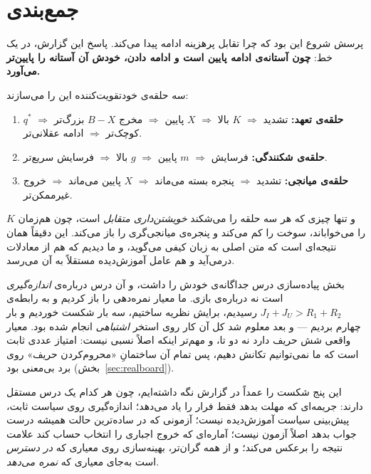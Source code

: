 \documentclass[12pt,a4paper]{article}
\begin{document}
\section{جمع‌بندی}\label{sec:concl}

پرسش شروع این بود که چرا تقابل پرهزینه ادامه پیدا می‌کند. پاسخ این گزارش،
در یک خط: \textbf{چون آستانه‌ی ادامه پایین است و ادامه دادن، خودش آن آستانه
را پایین‌تر می‌آورد.}

سه حلقه‌ی خودتقویت‌کننده این را می‌سازند:
\begin{enumerate}[leftmargin=1.7em,itemsep=3pt]
  \item \textbf{حلقه‌ی تعهد:} تشدید $\Rightarrow$ $K$ بالا $\Rightarrow$
        $X$ پایین $\Rightarrow$ مخرج $B-X$ بزرگ‌تر $\Rightarrow$
        $q^\ast$ کوچک‌تر $\Rightarrow$ ادامه عقلانی‌تر.
  \item \textbf{حلقه‌ی شکنندگی:} فرسایش $\Rightarrow$ $m$ پایین
        $\Rightarrow$ $g$ بالا $\Rightarrow$ فرسایش سریع‌تر.
  \item \textbf{حلقه‌ی میانجی:} تشدید $\Rightarrow$ پنجره بسته می‌ماند
        $\Rightarrow$ $X$ پایین می‌ماند $\Rightarrow$ خروج غیرممکن‌تر.
\end{enumerate}

و تنها چیزی که هر سه حلقه را می‌شکند \emph{خویشتن‌داری متقابل} است، چون
هم‌زمان $K$ را می‌خواباند، سوخت را کم می‌کند و پنجره‌ی میانجی‌گری را باز
می‌کند. این دقیقاً همان نتیجه‌ای است که متن اصلی به زبان کیفی می‌گوید، و ما
دیدیم که هم از معادلات درمی‌آید و هم عامل آموزش‌دیده مستقلاً به آن می‌رسد.

بخش پیاده‌سازی درس جداگانه‌ی خودش را داشت، و آن درس درباره‌ی
\emph{اندازه‌گیری} است نه درباره‌ی بازی. ما معیار نمره‌دهی را باز کردیم و به
رابطه‌ی $J_I+J_U>R_1+R_2$ رسیدیم، برایش نظریه ساختیم، سه بار شکست خوردیم و
بار چهارم بردیم — و بعد معلوم شد کل آن کار روی استخر \emph{اشتباهی} انجام
شده بود. معیار واقعی شش حریف دارد نه دو تا، و مهم‌تر اینکه اصلاً نسبی
نیست: امتیاز  عددی ثابت است که ما نمی‌توانیم تکانش دهیم، پس
تمام آن ساختمانِ «محروم‌کردن حریف» روی برد بی‌معنی بود
(بخش~\ref{sec:realboard}).

این پنج شکست را عمداً در گزارش نگه داشته‌ایم، چون هر کدام یک درس مستقل
دارند: جریمه‌ای که مهلت بدهد فقط فرار را یاد می‌دهد؛ اندازه‌گیری روی سیاست
ثابت، پیش‌بینی سیاست آموزش‌دیده نیست؛ آزمونی که در ساده‌ترین حالت همیشه
درست جواب بدهد اصلاً آزمون نیست؛ آماره‌ای که خروج اجباری را انتخاب حساب
کند علامت نتیجه را برعکس می‌کند؛ و از همه گران‌تر، بهینه‌سازی روی معیاری
که \emph{در دسترس} است به‌جای معیاری که \emph{نمره می‌دهد}.
\end{document}

